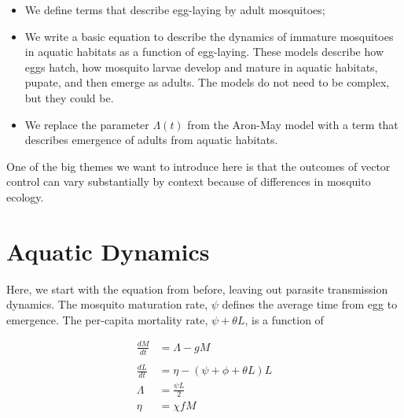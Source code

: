 \documentclass[
]{book}
\begin{document}
\begin{itemize}
\item
  We define terms that describe egg-laying by adult mosquitoes;
\item
  We write a basic equation to describe the dynamics of immature mosquitoes in aquatic habitats as a function of egg-laying. These models describe how eggs hatch, how mosquito larvae develop and mature in aquatic habitats, pupate, and then emerge as adults. The models do not need to be complex, but they could be.
\item
  We replace the parameter \(\Lambda(t)\) from the Aron-May model with a term that
  describes emergence of adults from aquatic habitats.
\end{itemize}

One of the big themes we want to introduce here is that the outcomes of vector control can vary substantially by context because of differences in mosquito ecology.

\hypertarget{aquatic-dynamics}{%
\section{Aquatic Dynamics}\label{aquatic-dynamics}}

Here, we start with the equation from before, leaving out parasite transmission dynamics. The mosquito maturation rate, \(\psi\) defines the average time from egg to emergence. The per-capita mortality rate, \(\psi + \theta L\), is a function of

\begin{equation}
\begin{array}{rl}
\frac{dM}{dt} &= \Lambda - g M\\  \\ \hline 
\frac{dL}{dt} &= \eta - (\psi + \phi + \theta L) L \\ 
\Lambda &= \frac{\psi L}{2} \\ 
\eta &= \chi f M \\ 
\end{array}
\end{equation}
\end{document}
